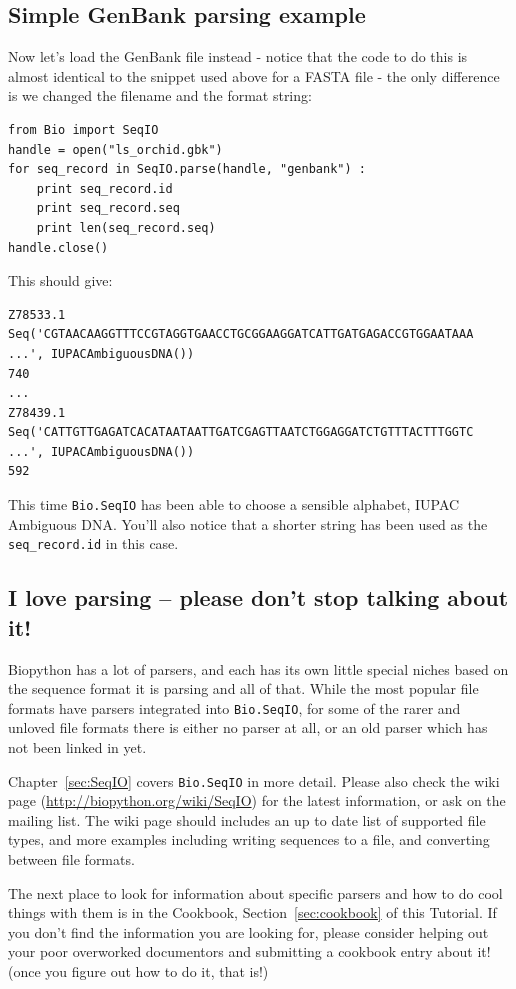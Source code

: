 \documentclass{report}
\begin{document}
\subsection{Simple GenBank parsing example}

Now let's load the GenBank file instead - notice that the code to do this is almost identical to the snippet used above for a FASTA file - the only difference is we changed the filename and the format string:

\begin{verbatim}
from Bio import SeqIO
handle = open("ls_orchid.gbk")
for seq_record in SeqIO.parse(handle, "genbank") :
    print seq_record.id
    print seq_record.seq
    print len(seq_record.seq)
handle.close()
\end{verbatim}

\noindent This should give:

\begin{verbatim}
Z78533.1
Seq('CGTAACAAGGTTTCCGTAGGTGAACCTGCGGAAGGATCATTGATGAGACCGTGGAATAAA ...', IUPACAmbiguousDNA())
740
...
Z78439.1
Seq('CATTGTTGAGATCACATAATAATTGATCGAGTTAATCTGGAGGATCTGTTTACTTTGGTC ...', IUPACAmbiguousDNA())
592
\end{verbatim}

This time \verb|Bio.SeqIO| has been able to choose a sensible alphabet, IUPAC Ambiguous DNA.  You'll also notice that a shorter string has been used as the \verb|seq_record.id| in this case.

\subsection{I love parsing -- please don't stop talking about it!}

Biopython has a lot of parsers, and each has its own little special niches based on the sequence format it is parsing and all of that.  While the most popular file formats have parsers integrated into \verb|Bio.SeqIO|, for some of the rarer and unloved file formats there is either no parser at all, or an old parser which has not been linked in yet.

Chapter~\ref{sec:SeqIO} covers \verb|Bio.SeqIO| in more detail.  Please also check the wiki page (\url{http://biopython.org/wiki/SeqIO}) for the latest information, or ask on the mailing list. The wiki page should includes an up to date list of supported file types, and more examples including writing sequences to a file, and converting between file formats.

The next place to look for information about specific parsers and how to do cool things with them is in the Cookbook, Section~\ref{sec:cookbook} of this Tutorial. If you don't find the information you are looking for, please consider helping out your poor overworked documentors and submitting a cookbook entry about it! (once you figure out how to do it, that is!)
\end{document}
